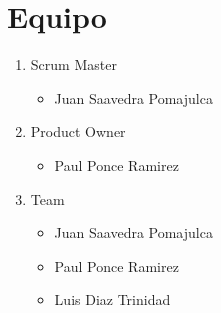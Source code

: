 \chapter{Equipo}
\setlength{\parindent}{0pt}
\begin{enumerate}
	\item Scrum Master
	\begin{itemize}
		\item Juan Saavedra Pomajulca
	\end{itemize}
	\item Product Owner
	\begin{itemize}
		\item Paul Ponce Ramirez
	\end{itemize}
	\item Team
	\begin{itemize}
		\item Juan Saavedra Pomajulca	
		\item Paul Ponce Ramirez
		\item Luis Diaz Trinidad
	\end{itemize}
\end{enumerate}